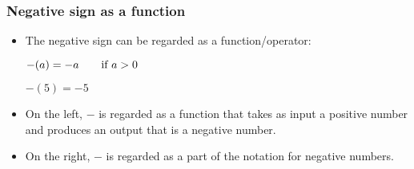 \begin{frame}
\frametitle{Negative sign as a function}
\begin{itemize}
\item The negative sign can be regarded as a function/operator:
\begin{mathematicalRule}
\hfil\hfil$
-(a)=-a \text{\quad\quad if } a>0
$
\end{mathematicalRule}
\begin{example}
\hfil\hfil $-(5)=-5$
\end{example}
\item On the left, $-$ is regarded as a function that takes as input a positive number and produces an output that is a negative number.
\item On the right, $-$ is regarded as a part of the notation for negative numbers.
\end{itemize}

\end{frame}